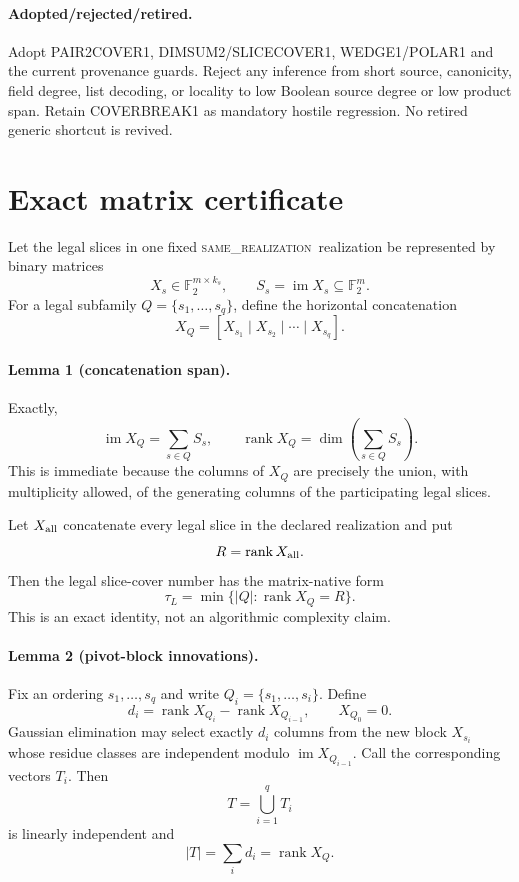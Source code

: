\documentclass[11pt]{article}
\newcommand{\Ftwo}{\mathbb F_2}
\newcommand{\same}{\textsc{same\_realization}}
\begin{document}
\paragraph{Adopted/rejected/retired.}
Adopt PAIR2COVER1, DIMSUM2/SLICECOVER1, WEDGE1/POLAR1 and the current provenance guards. Reject any inference from short source, canonicity, field degree, list decoding, or locality to low Boolean source degree or low product span. Retain COVERBREAK1 as mandatory hostile regression. No retired generic shortcut is revived.

\section*{Exact matrix certificate}
Let the legal slices in one fixed \same\ realization be represented by binary matrices
\[
 X_s\in\Ftwo^{m\times k_s},\qquad S_s=\operatorname{im}X_s\subseteq\Ftwo^m.
\]
For a legal subfamily \(Q=\{s_1,\ldots,s_q\}\), define the horizontal concatenation
\[
 X_Q=[X_{s_1}\mid X_{s_2}\mid\cdots\mid X_{s_q}].
\]

\paragraph{Lemma 1 (concatenation span).}
Exactly,
\[
 \operatorname{im}X_Q=\sum_{s\in Q}S_s,
 \qquad
 \operatorname{rank}X_Q=\dim\!\left(\sum_{s\in Q}S_s\right).
\]
This is immediate because the columns of \(X_Q\) are precisely the union, with multiplicity allowed, of the generating columns of the participating legal slices.

Let \(X_{\rm all}\) concatenate every legal slice in the declared realization and put
\[
 R=\operatorname{rank}X_{\rm all}.
\]
Then the legal slice-cover number has the matrix-native form
\[
 \boxed{\tau_L=\min\{|Q|:\operatorname{rank}X_Q=R\}}.
\]
This is an exact identity, not an algorithmic complexity claim.

\paragraph{Lemma 2 (pivot-block innovations).}
Fix an ordering \(s_1,\ldots,s_q\) and write \(Q_i=\{s_1,\ldots,s_i\}\). Define
\[
 d_i=\operatorname{rank}X_{Q_i}-\operatorname{rank}X_{Q_{i-1}},
 \qquad X_{Q_0}=0.
\]
Gaussian elimination may select exactly \(d_i\) columns from the new block \(X_{s_i}\) whose residue classes are independent modulo \(\operatorname{im}X_{Q_{i-1}}\). Call the corresponding vectors \(T_i\). Then
\[
 T=\bigcup_{i=1}^qT_i
\]
is linearly independent and
\[
 |T|=\sum_i d_i=\operatorname{rank}X_Q.
\]
\end{document}
